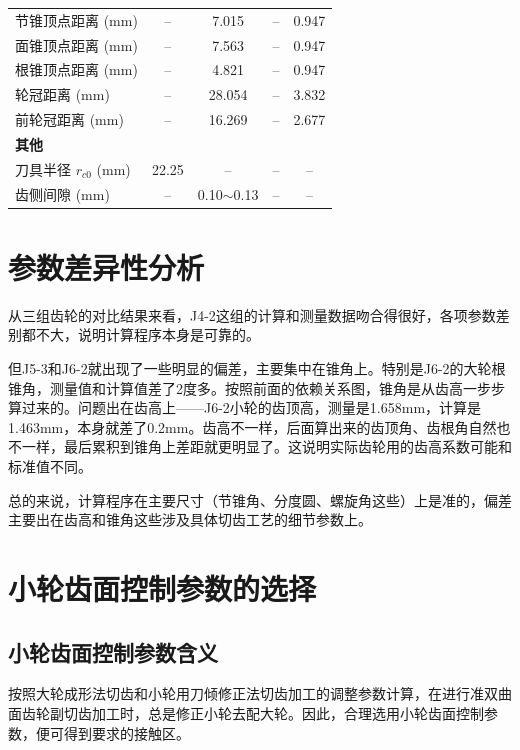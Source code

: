 ﻿\documentclass{article}
\begin{document}
\begin{table}[htbp]
\begin{tabular}{@{}lcccc@{}}
节锥顶点距离 (mm) & -- & 7.015 & -- & 0.947 \\
面锥顶点距离 (mm) & -- & 7.563 & -- & 0.947 \\
根锥顶点距离 (mm) & -- & 4.821 & -- & 0.947 \\
轮冠距离 (mm) & -- & 28.054 & -- & 3.832 \\
前轮冠距离 (mm) & -- & 16.269 & -- & 2.677 \\
\midrule
\multicolumn{5}{l}{\textbf{其他}} \\
刀具半径 $r_{c0}$ (mm) & 22.25 & -- & -- & -- \\
齿侧间隙 (mm) & -- & 0.10$\sim$0.13 & -- & -- \\
\bottomrule
\end{tabular}
\end{table}


\section{参数差异性分析}

从三组齿轮的对比结果来看，J4-2这组的计算和测量数据吻合得很好，各项参数差别都不大，说明计算程序本身是可靠的。

但J5-3和J6-2就出现了一些明显的偏差，主要集中在锥角上。特别是J6-2的大轮根锥角，测量值和计算值差了2度多。按照前面的依赖关系图，锥角是从齿高一步步算过来的。问题出在齿高上——J6-2小轮的齿顶高，测量是1.658mm，计算是1.463mm，本身就差了0.2mm。齿高不一样，后面算出来的齿顶角、齿根角自然也不一样，最后累积到锥角上差距就更明显了。这说明实际齿轮用的齿高系数可能和标准值不同。

总的来说，计算程序在主要尺寸（节锥角、分度圆、螺旋角这些）上是准的，偏差主要出在齿高和锥角这些涉及具体切齿工艺的细节参数上。



\section{小轮齿面控制参数的选择}

\subsection{小轮齿面控制参数含义}

按照大轮成形法切齿和小轮用刀倾修正法切齿加工的调整参数计算，在进行准双曲面齿轮副切齿加工时，总是修正小轮去配大轮。因此，合理选用小轮齿面控制参数，便可得到要求的接触区。
\end{document}
